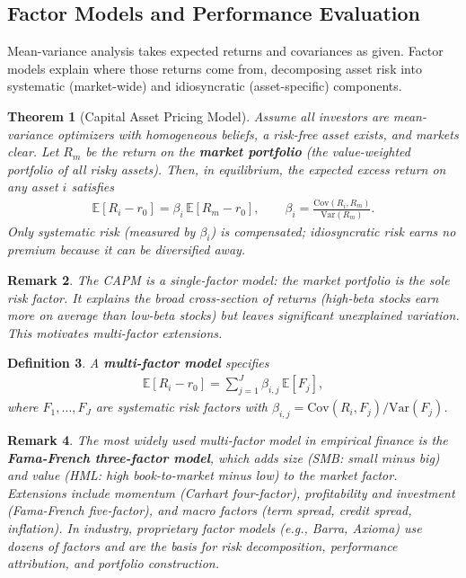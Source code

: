 \documentclass{report}
\theoremstyle{spacedplain}
\newtheorem{theorem}{Theorem}[section]
\theoremstyle{spaceddefinition}
\newtheorem{definition}[theorem]{Definition}
\theoremstyle{spacedremark}
\newtheorem{remark}[theorem]{Remark}
\begin{document}
\subsection{Factor Models and Performance Evaluation}

Mean-variance analysis takes expected returns and covariances as given. Factor models explain where those returns come from, decomposing asset risk into systematic (market-wide) and idiosyncratic (asset-specific) components.

\begin{theorem}[Capital Asset Pricing Model]
Assume all investors are mean-variance optimizers with homogeneous beliefs, a risk-free asset exists, and markets clear. Let $R_m$ be the return on the \textbf{market portfolio} (the value-weighted portfolio of all risky assets). Then, in equilibrium, the expected excess return on any asset $i$ satisfies
\begin{align}
    \mathbb{E}[R_i - r_0] = \beta_i\,\mathbb{E}[R_m - r_0], \qquad \beta_i = \frac{\text{Cov}(R_i, R_m)}{\text{Var}(R_m)}.
\end{align}
Only systematic risk (measured by $\beta_i$) is compensated; idiosyncratic risk earns no premium because it can be diversified away.
\end{theorem}

\begin{remark}
The CAPM is a single-factor model: the market portfolio is the sole risk factor. It explains the broad cross-section of returns (high-beta stocks earn more on average than low-beta stocks) but leaves significant unexplained variation. This motivates multi-factor extensions.
\end{remark}

\begin{definition}
A \textbf{multi-factor model} specifies
\begin{align}
    \mathbb{E}[R_i - r_0] = \sum_{j=1}^J \beta_{i,j}\,\mathbb{E}[F_j],
\end{align}
where $F_1, \ldots, F_J$ are systematic risk factors with $\beta_{i,j} = \text{Cov}(R_i, F_j)/\text{Var}(F_j)$.
\end{definition}

\begin{remark}
The most widely used multi-factor model in empirical finance is the \textbf{Fama-French three-factor model}, which adds size (SMB: small minus big) and value (HML: high book-to-market minus low) to the market factor. Extensions include momentum (Carhart four-factor), profitability and investment (Fama-French five-factor), and macro factors (term spread, credit spread, inflation). In industry, proprietary factor models (e.g., Barra, Axioma) use dozens of factors and are the basis for risk decomposition, performance attribution, and portfolio construction.
\end{remark}
\end{document}
